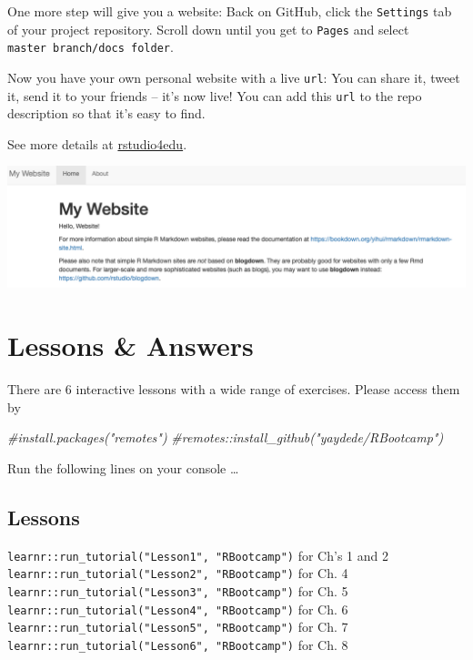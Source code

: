 \documentclass[
]{book}
\newenvironment{Shaded}{\begin{snugshade}}{\end{snugshade}}
\newcommand{\CommentTok}[1]{\textcolor[rgb]{0.56,0.35,0.01}{\textit{#1}}}
\begin{document}
One more step will give you a website: Back on GitHub, click the \texttt{Settings} tab of your project repository. Scroll down until you get to \texttt{Pages} and select \texttt{master\ branch/docs\ folder}.

Now you have your own personal website with a live \texttt{url}: You can share it, tweet it, send it to your friends -- it's now live! You can add this \texttt{url} to the repo description so that it's easy to find.

See more details at \href{https://rstudio4edu.github.io/rstudio4edu-book/make-rmd.html}{rstudio4edu}.

\includegraphics[width=14.68in]{png/website}

\hypertarget{lessons-answers}{%
\chapter{Lessons \& Answers}\label{lessons-answers}}

There are 6 interactive lessons with a wide range of exercises. Please access them by

\begin{Shaded}
\begin{Highlighting}[]
\CommentTok{\#install.packages("remotes")}
\CommentTok{\#remotes::install\_github("yaydede/RBootcamp")}
\end{Highlighting}
\end{Shaded}

Run the following lines on your console \ldots{}

\hypertarget{lessons}{%
\section{Lessons}\label{lessons}}

\texttt{learnr::run\_tutorial("Lesson1",\ "RBootcamp")} for Ch's 1 and 2\\
\texttt{learnr::run\_tutorial("Lesson2",\ "RBootcamp")} for Ch. 4\\
\texttt{learnr::run\_tutorial("Lesson3",\ "RBootcamp")} for Ch. 5\\
\texttt{learnr::run\_tutorial("Lesson4",\ "RBootcamp")} for Ch. 6\\
\texttt{learnr::run\_tutorial("Lesson5",\ "RBootcamp")} for Ch. 7\\
\texttt{learnr::run\_tutorial("Lesson6",\ "RBootcamp")} for Ch. 8
\end{document}
